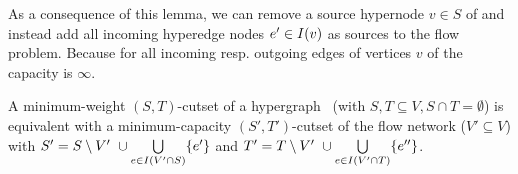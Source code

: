 As a consequence of this lemma, we can remove 
a source hypernode $v \in S$ of  and instead add all
incoming hyperedge nodes $e' \in I(v)$ as sources to the flow 
problem. Because for all incoming resp. outgoing edges of vertices $v$ of 
 the capacity is $\infty$.

\begin{theorem}
\label{theorem:st_cutset_equal}
A minimum-weight $(S,T)$-cutset of a hypergraph \HypergraphDef~(with $S,T \subseteq V,
S \cap T = \emptyset$) is equivalent with a minimum-capacity $(S',T')$-cutset of the
flow network  ($V' \subseteq V$) with $S' = S \setminus V'\ \cup \bigcup\limits_{e \in I(V' \cap S)} \{e'\}$ and 
$T' = T \setminus V'\ \cup \bigcup\limits_{e \in I(V'\cap T)} \{e''\}$.
\label{theorem:heuer_network}
\end{theorem}

